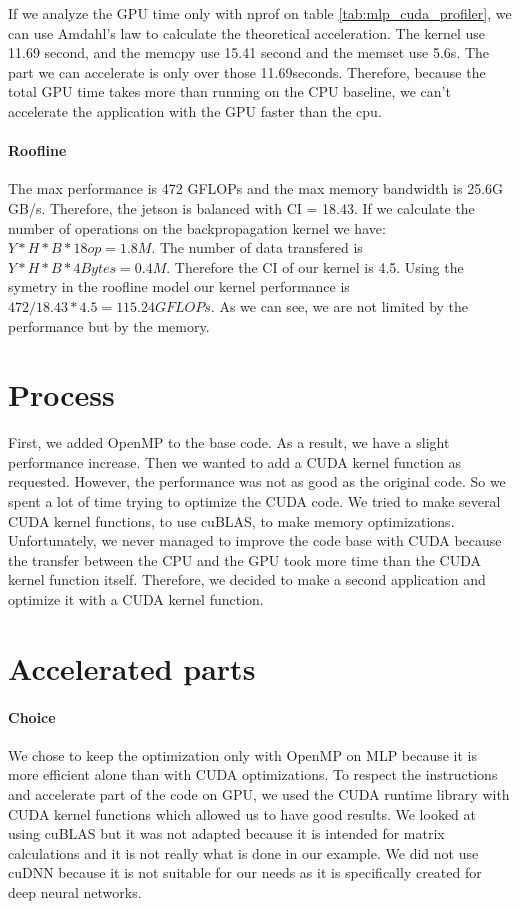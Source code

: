 \documentclass[11pt]{article}
\begin{document}
If we analyze the GPU time only with nprof on table \ref{tab:mlp_cuda_profiler}, we can use Amdahl's law to calculate the theoretical acceleration.
The kernel use 11.69 second, and the memcpy use 15.41 second and the memset use 5.6s. The part we can accelerate is only over those 11.69seconds.
Therefore, because the total GPU time takes more than running on the CPU baseline, we can't accelerate the application with the GPU faster than the cpu.

\paragraph*{Roofline} 

The max performance is 472 GFLOPs and the max memory bandwidth is 25.6G GB/s. Therefore, the jetson is balanced with CI = 18.43.
If we calculate the number of operations on the backpropagation kernel we have: $Y * H * B * 18op = 1.8M$. The number of data transfered is $Y * H * B * 4Bytes = 0.4M$. 
Therefore the CI of our kernel is 4.5. Using the symetry in the roofline model our kernel performance is $ 472 / 18.43 * 4.5 = 115.24 GFLOPs$.
As we can see, we are not limited by the performance but by the memory.


\section{Process}
First, we added OpenMP to the base code. As a result, we have a slight performance increase.
Then we wanted to add a CUDA kernel function as requested.
However, the performance was not as good as the original code.
So we spent a lot of time trying to optimize the CUDA code.
We tried to make several CUDA kernel functions, to use cuBLAS, to make memory optimizations.
Unfortunately, we never managed to improve the code base with CUDA
because the transfer between the CPU and the GPU took more time than the CUDA kernel function itself.
Therefore, we decided to make a second application and optimize it with a CUDA kernel function.

\section{Accelerated parts}

\paragraph*{Choice}
We chose to keep the optimization only with OpenMP on MLP because it is more efficient alone than with CUDA optimizations.
To respect the instructions and accelerate part of the code on GPU, we used the CUDA runtime library with CUDA kernel functions which allowed us to have good results.
We looked at using cuBLAS but it was not adapted because it is intended for matrix calculations and it is not really what is done in our example.
We did not use cuDNN because it is not suitable for our needs as it is specifically created for deep neural networks.
\end{document}
